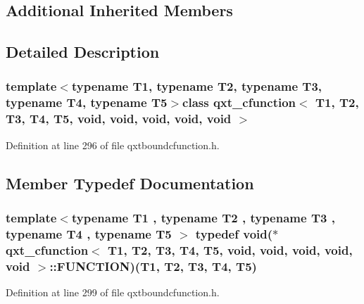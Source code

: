 \subsection*{Additional Inherited Members}


\subsection{Detailed Description}
\subsubsection*{template$<$typename T1, typename T2, typename T3, typename T4, typename T5$>$class qxt\-\_\-cfunction$<$ T1, T2, T3, T4, T5, void, void, void, void, void $>$}



Definition at line 296 of file qxtboundcfunction.\-h.



\subsection{Member Typedef Documentation}
\hypertarget{classqxt__cfunction_3_01_t1_00_01_t2_00_01_t3_00_01_t4_00_01_t5_00_01void_00_01void_00_01void_00_01void_00_01void_01_4_a0317226a55c43e0ac87aba638eea3df0}{
\subsubsection[{F\-U\-N\-C\-T\-I\-O\-N}]{\setlength{\rightskip}{0pt plus 5cm}template$<$typename T1 , typename T2 , typename T3 , typename T4 , typename T5 $>$ typedef {\bf void}($\ast$ {\bf qxt\-\_\-cfunction}$<$ T1, T2, T3, T4, T5, {\bf void}, {\bf void}, {\bf void}, {\bf void}, {\bf void} $>$\-::F\-U\-N\-C\-T\-I\-O\-N)(T1, T2, T3, T4, T5)}}\label{classqxt__cfunction_3_01_t1_00_01_t2_00_01_t3_00_01_t4_00_01_t5_00_01void_00_01void_00_01void_00_01void_00_01void_01_4_a0317226a55c43e0ac87aba638eea3df0}


Definition at line 299 of file qxtboundcfunction.\-h.




